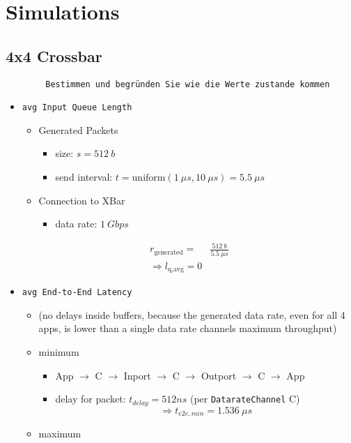 \documentclass[]{scrartcl}
\begin{document}
    \section{Simulations}
    \subsection{4x4 Crossbar}
    \begin{verbatim}
        Bestimmen und begründen Sie wie die Werte zustande kommen
    \end{verbatim}

    \begin{itemize}
        \item \verb|avg Input Queue Length|
            \begin{itemize}
                \item Generated Packets
                    \begin{itemize}
                        \item size: $ s = \SI{512}{b}$
                        \item send interval: $ t = \text{uniform}(\SI{1}{\mu s}, \SI{10}{\mu s}) = \SI{5.5}{\mu s}$
                    \end{itemize}
                \item Connection to XBar
                    \begin{itemize}
                        \item data rate: $\SI{1}{Gbps}$
                    \end{itemize}
            \end{itemize}

        \begin{align}
            r_\text{generated} =& \frac{\SI{512}{b}}{\SI{5.5}{\mu s}}\\
            \Rightarrow l_\text{q,avg} = 0
        \end{align}

        \item \verb|avg End-to-End Latency|
            \begin{itemize}
                \item (no delays inside buffers, because the generated data rate, even for all 4 apps, is lower than a single data rate channels maximum throughput)
                \item minimum
                    \begin{itemize}
                        \item App $\rightarrow$ C $\rightarrow$ Inport
                            $\rightarrow$ C $\rightarrow$ Outport $\rightarrow$ C $\rightarrow$ App
                        \item delay for packet: $t_{delay}=512ns$ (per \verb|DatarateChannel| C)
                            \begin{equation}
                                \Rightarrow t_{e2e,min} = \SI{1.536}{\mu s}
                            \end{equation}
                    \end{itemize}
                \item maximum


\end{itemize}
\end{itemize}
\end{document}
